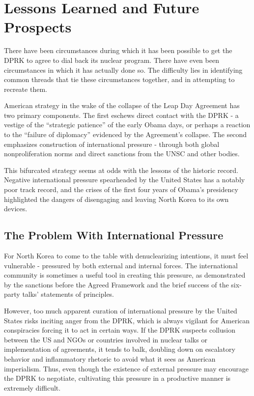 \section{Lessons Learned and Future Prospects}

There have been circumstances during which it has been possible to get the DPRK to agree to dial back its nuclear program. There have even been circumstances in which it has actually done so. The difficulty lies in identifying common threads that tie these circumstances together, and in attempting to recreate them.

American strategy in the wake of the collapse of the Leap Day Agreement has two primary components. The first eschews direct contact with the DPRK - a vestige of the ``strategic patience'' of the early Obama days, or perhaps a reaction to the ``failure of diplomacy'' evidenced by the Agreement's collapse. The second emphasizes construction of international pressure - through both global nonproliferation norms and direct sanctions from the UNSC and other bodies.

This bifurcated strategy seems at odds with the lessons of the historic record. Negative international pressure spearheaded by the United States has a notably poor track record, and the crises of the first four years of Obama's presidency highlighted the dangers of disengaging and leaving North Korea to its own devices.

\subsection{The Problem With International Pressure}

For North Korea to come to the table with denuclearizing intentions, it must feel vulnerable - pressured by both external and internal forces. The international community is sometimes a useful tool in creating this pressure, as demonstrated by the sanctions before the Agreed Framework and the brief success of the six-party talks' statements of principles. 

However, too much apparent curation of international pressure by the United States risks inciting anger from the DPRK, which is always vigilant for American conspiracies forcing it to act in certain ways. If the DPRK suspects collusion between the US and NGOs or countries involved in nuclear talks or implementation of agreements, it tends to balk, doubling down on escalatory behavior and inflammatory rhetoric to avoid what it sees as American imperialism. Thus, even though the existence of external pressure may encourage the DPRK to negotiate, cultivating this pressure in a productive manner is extremely difficult.

